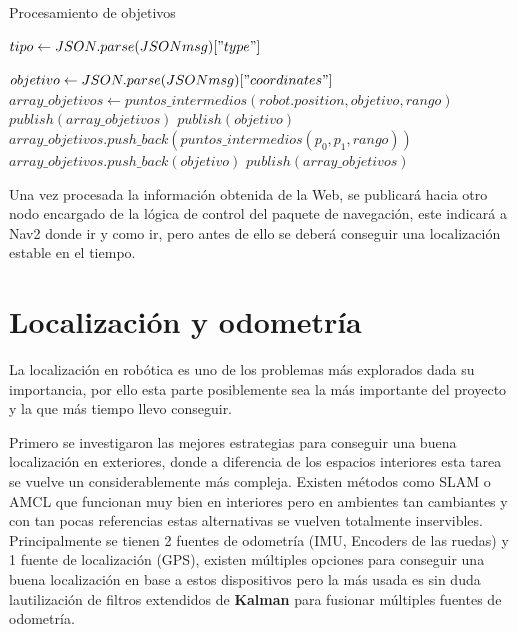 \begin{algorithm}[H]
  \caption{Procesamiento de objetivos}\label{objetivos}
  \begin{algorithmic}[1]
     
        \State $tipo\gets JSON.parse(JSONmsg)["type"]$
       
            \State $objetivo\gets JSON.parse(JSONmsg)["coordinates"]$
                \State $array\_objetivos \gets puntos\_intermedios(robot.position, objetivo, rango)$ 
                \State $publish(array\_objetivos)$
             \Else
                \State $publish(objetivo)$
             \EndIf
        \Else
             
                \State $array\_objetivos.push\_back( puntos\_intermedios(p_0, p_1, rango))$
             \Else
                \State $array\_objetivos.push\_back(objetivo)$
             \EndIf
            \EndFor
            \State $publish(array\_objetivos)$
        \EndIf
    \EndProcedure
  \end{algorithmic}
\end{algorithm}

Una vez procesada la información obtenida de la Web, se publicará hacia otro nodo encargado de la lógica de control del paquete de 
navegación, este indicará a Nav2 donde ir y como ir, pero antes de ello se deberá conseguir una localización estable en el tiempo.

\section{Localización y odometría}

La localización en robótica es uno de los problemas más explorados dada su importancia, por ello esta parte posiblemente sea la más 
importante del proyecto y la que más tiempo llevo conseguir.

Primero se investigaron las mejores estrategias para conseguir una buena localización en exteriores, donde a diferencia de los espacios interiores 
esta tarea se vuelve un considerablemente más compleja. Existen métodos como SLAM o AMCL que funcionan muy bien en interiores pero en 
ambientes tan cambiantes y con tan pocas referencias estas alternativas se vuelven totalmente 
inservibles.
Principalmente se tienen 2 fuentes de odometría (IMU, Encoders de las ruedas) y 1 fuente de localización (GPS), existen múltiples 
opciones para conseguir una buena localización en base a estos dispositivos 
pero la más usada es sin duda lautilización de filtros extendidos de \textbf{Kalman} para fusionar múltiples fuentes de odometría. 
 
